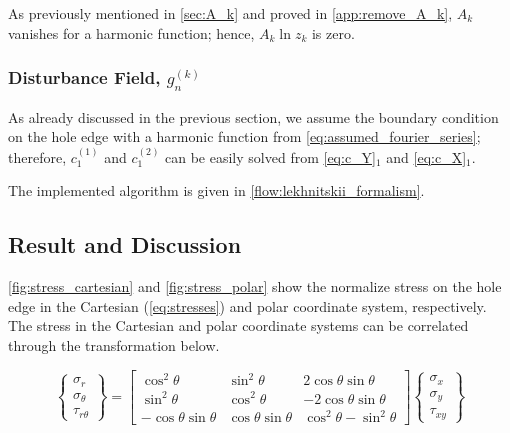 \documentclass{article}
\begin{document}
As previously mentioned in \cref{sec:A_k} and proved in \cref{app:remove_A_k}, $A_k$ vanishes for a harmonic function; hence, $A_k \ln z_k$ is zero.

\subsubsection{Disturbance Field, \texorpdfstring{$g_n^{(k)}$}{}}
As already discussed in the previous section, we assume the boundary condition on the hole edge with a harmonic function from \cref{eq:assumed_fourier_series}; therefore, $c_1^{(1)}$ and $c_1^{(2)}$ can be easily solved from \cref{eq:c_Y}$_1$ and \cref{eq:c_X}$_1$.

The implemented algorithm is given in \cref{flow:lekhnitskii_formalism}.

\subsection{Result and Discussion}
\cref{fig:stress_cartesian} and \cref{fig:stress_polar} show the normalize stress on the hole edge in the Cartesian (\cref{eq:stresses}) and polar coordinate system, respectively. The stress in the Cartesian and polar coordinate systems can be correlated through the transformation below.

\begin{equation}
    \begin{Bmatrix}
\sigma_r\\ 
\sigma_{\theta}\\ 
\tau_{r\theta}
\end{Bmatrix} = 
\begin{bmatrix}
\cos^2\theta & \sin^2\theta & 2\cos\theta \sin\theta \\ 
\sin^2\theta & \cos^2\theta & -2\cos\theta \sin\theta\\ 
-\cos\theta \sin\theta & \cos\theta \sin\theta & \cos^2\theta - \sin^2\theta
\end{bmatrix}
\begin{Bmatrix}
\sigma_x\\ 
\sigma_y\\ 
\tau_{xy}
\end{Bmatrix}
\label{eq:stress_polar}
\end{equation}
\end{document}
